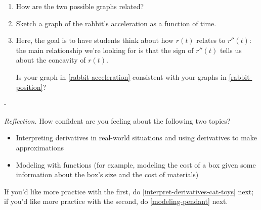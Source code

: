 \documentclass{article}
\makeatletter
\newlength{\tipmargin}
\renewenvironment{framed}{
  \setlength{\tipmargin}{\textwidth-\linewidth}
  \advance\@totalleftmargin-\tipmargin
  \def\FrameCommand{\hspace{\tipmargin}\fbox}%
  \advance\linewidth\tipmargin
  \MakeFramed {\advance\hsize-\width \FrameRestore}%
}
{\endMakeFramed}
\makeatother
\begin{document}
\begin{enumerate}
\begin{enumerate}
  \item
    \begin{problem}[\stretch{0.3}]
      How are the two possible graphs related?
    \end{problem}

  \item \label{rabbit-acceleration}
    \begin{problem}[\stretch{2.5}]
      Sketch a graph of the rabbit's acceleration as a function of time. 
    \end{problem}

  \item

    \begin{workshop}
      Here, the goal is to have students think about how $r(t)$ relates to $r''(t)$: the main relationship we're looking for is that the sign of $r''(t)$ tells us about the concavity of $r(t)$. 
    \end{workshop}

    \begin{problem}[\vfill]
      Is your graph in \ref{rabbit-acceleration} consistent with your graphs in \ref{rabbit-position}?
    \end{problem}

  \end{enumerate}

\end{enumerate}
\begin{problemonly}
  \begin{framed}
    \emph{Reflection.} How confident are you feeling about the following two topics?
    \begin{itemize}[nosep]
    \item Interpreting derivatives in real-world situations and using derivatives to make approximations
    \item Modeling with functions (for example, modeling the cost of a box given some information about the box's size and the cost of materials)
    \end{itemize}
    If you'd like more practice with the first, do \ref{interpret-derivatives-cat-toys} next; if you'd like more practice with the second, do \ref{modeling-pendant} next.
  \end{framed}
\end{problemonly}

\pspace{\newpage}
\end{document}
